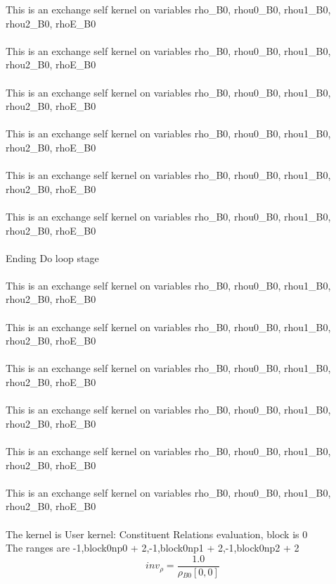 \documentclass{article}
\begin{document}
\noindent This is an exchange self kernel on variables rho_B0, rhou0_B0, rhou1_B0, rhou2_B0, rhoE_B0\\\\\noindent This is an exchange self kernel on variables rho_B0, rhou0_B0, rhou1_B0, rhou2_B0, rhoE_B0\\\\\noindent This is an exchange self kernel on variables rho_B0, rhou0_B0, rhou1_B0, rhou2_B0, rhoE_B0\\\\\noindent This is an exchange self kernel on variables rho_B0, rhou0_B0, rhou1_B0, rhou2_B0, rhoE_B0\\\\\noindent This is an exchange self kernel on variables rho_B0, rhou0_B0, rhou1_B0, rhou2_B0, rhoE_B0\\\\\noindent This is an exchange self kernel on variables rho_B0, rhou0_B0, rhou1_B0, rhou2_B0, rhoE_B0\\\\\noindent Ending Do loop stage\\
\\\noindent This is an exchange self kernel on variables rho_B0, rhou0_B0, rhou1_B0, rhou2_B0, rhoE_B0\\\\\noindent This is an exchange self kernel on variables rho_B0, rhou0_B0, rhou1_B0, rhou2_B0, rhoE_B0\\\\\noindent This is an exchange self kernel on variables rho_B0, rhou0_B0, rhou1_B0, rhou2_B0, rhoE_B0\\\\\noindent This is an exchange self kernel on variables rho_B0, rhou0_B0, rhou1_B0, rhou2_B0, rhoE_B0\\\\\noindent This is an exchange self kernel on variables rho_B0, rhou0_B0, rhou1_B0, rhou2_B0, rhoE_B0\\\\\noindent This is an exchange self kernel on variables rho_B0, rhou0_B0, rhou1_B0, rhou2_B0, rhoE_B0\\\\\noindent The kernel is User kernel: Constituent Relations evaluation, block is 0\\\noindent The ranges are -1,block0np0 + 2,-1,block0np1 + 2,-1,block0np2 + 2\\\begin{dmath}inv_{\rho} = \frac{1.0}{{\rho{_{B0}}}[{0,0}]}\end{dmath}
\end{document}
